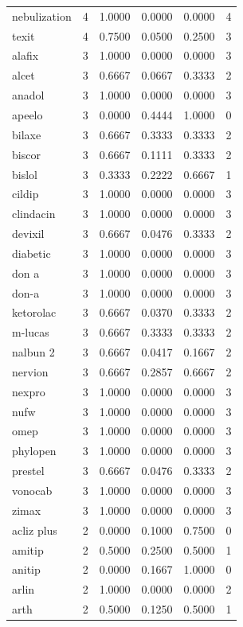 \begin{longtable}{p{3.0cm}rrrrr}
nebulization & 4 & 1.0000 & 0.0000 & 0.0000 & 4 \\
texit & 4 & 0.7500 & 0.0500 & 0.2500 & 3 \\
alafix & 3 & 1.0000 & 0.0000 & 0.0000 & 3 \\
alcet & 3 & 0.6667 & 0.0667 & 0.3333 & 2 \\
anadol & 3 & 1.0000 & 0.0000 & 0.0000 & 3 \\
apeelo & 3 & 0.0000 & 0.4444 & 1.0000 & 0 \\
bilaxe & 3 & 0.6667 & 0.3333 & 0.3333 & 2 \\
biscor & 3 & 0.6667 & 0.1111 & 0.3333 & 2 \\
bislol & 3 & 0.3333 & 0.2222 & 0.6667 & 1 \\
cildip & 3 & 1.0000 & 0.0000 & 0.0000 & 3 \\
clindacin & 3 & 1.0000 & 0.0000 & 0.0000 & 3 \\
devixil & 3 & 0.6667 & 0.0476 & 0.3333 & 2 \\
diabetic & 3 & 1.0000 & 0.0000 & 0.0000 & 3 \\
don a & 3 & 1.0000 & 0.0000 & 0.0000 & 3 \\
don-a & 3 & 1.0000 & 0.0000 & 0.0000 & 3 \\
ketorolac & 3 & 0.6667 & 0.0370 & 0.3333 & 2 \\
m-lucas & 3 & 0.6667 & 0.3333 & 0.3333 & 2 \\
nalbun 2 & 3 & 0.6667 & 0.0417 & 0.1667 & 2 \\
nervion & 3 & 0.6667 & 0.2857 & 0.6667 & 2 \\
nexpro & 3 & 1.0000 & 0.0000 & 0.0000 & 3 \\
nufw & 3 & 1.0000 & 0.0000 & 0.0000 & 3 \\
omep & 3 & 1.0000 & 0.0000 & 0.0000 & 3 \\
phylopen & 3 & 1.0000 & 0.0000 & 0.0000 & 3 \\
prestel & 3 & 0.6667 & 0.0476 & 0.3333 & 2 \\
vonocab & 3 & 1.0000 & 0.0000 & 0.0000 & 3 \\
zimax & 3 & 1.0000 & 0.0000 & 0.0000 & 3 \\
acliz plus & 2 & 0.0000 & 0.1000 & 0.7500 & 0 \\
amitip & 2 & 0.5000 & 0.2500 & 0.5000 & 1 \\
anitip & 2 & 0.0000 & 0.1667 & 1.0000 & 0 \\
arlin & 2 & 1.0000 & 0.0000 & 0.0000 & 2 \\
arth & 2 & 0.5000 & 0.1250 & 0.5000 & 1 \\

\end{longtable}
